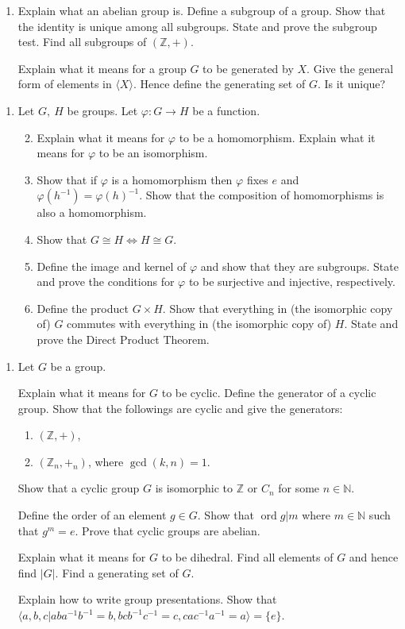 \documentclass[11pt]{article}
\newlength{\qspace}
\newcounter{qnumber}
\newenvironment{question}%
 {\vspace{\qspace}
  \begin{enumerate}[\bfseries 1\quad][10]%
    \setcounter{enumi}{\value{qnumber}}%
    \item%
 }
{
  \end{enumerate}
  \filbreak
  \stepcounter{qnumber}
 }
\newenvironment{questionparts}[1][1]%
 {
  \begin{enumerate}[\bfseries (i)]%
    \setcounter{enumii}{#1}
    \addtocounter{enumii}{-1}
    \setlength{\parskip}{3pt}
 }
 {
  \end{enumerate}
 }
\begin{document}
\begin{question}
Explain what an abelian group is. Define a subgroup of a group. Show that the identity is unique among all subgroups. State and prove the subgroup test.
Find all subgroups of $ (\mathbb{Z} ,+) $.

Explain what it means for a group $G$ to be generated by $X$. Give the general form of elements in $ \langle X \rangle  $. Hence define the generating set of $G$. Is it unique?
\end{question}

\begin{question}
  Let $ G,\ H $ be groups. Let $ \varphi: G\to H $ be a function.

  \begin{questionparts}
    \item Explain what it means for $ \varphi $ to be a homomorphism. Explain what it means for $ \varphi $ to be an isomorphism.
    \item Show that if $ \varphi $ is a homomorphism then $ \varphi $ fixes $e$ and $ \varphi (h^{-1})=\varphi (h)^{-1} $. Show that the composition of homomorphisms is also a homomorphism.
    \item Show that $ G \cong H \Leftrightarrow H \cong G $.
    \item Define the image and kernel of $ \varphi $ and show that they are subgroups. State and prove the conditions for $ \varphi $ to be surjective and injective, respectively.
    \item Define the product $ G \times H $. Show that everything in (the isomorphic copy of) $G$ commutes with everything in (the isomorphic copy of) $H$. State and prove the Direct Product Theorem.
  \end{questionparts}
\end{question}
\newpage
\begin{question}
  Let $G$ be a group. 
  
  Explain what it means for $G$ to be cyclic. Define the generator of a cyclic group. Show that the followings are cyclic and give the generators:
    \begin{enumerate}
      \item $ (\mathbb{Z} ,+) $,
      \item $ (\mathbb{Z}_n, +_n) $, where $ \gcd(k,n)=1 $.
    \end{enumerate}
  
  Show that a cyclic group $G$ is isomorphic to $ \mathbb{Z}  $ or $ C_n $ for some $ n\in \mathbb{N} $.

  Define the order of an element $ g\in G $. Show that $ \operatorname{ord} g |m$ where $ m\in \mathbb{N} $ such that $ g^m=e $. Prove that cyclic groups are abelian.

  Explain what it means for $G$ to be dihedral. Find all elements of $G$ and hence find $ |G| $. Find a generating set of $G$.

  Explain how to write group presentations. Show that $ \langle a,b,c| aba^{-1}b^{-1}=b, bcb^{-1}c^{-1}=c, cac^{-1}a^{-1}=a \rangle=\{e\} $.
\end{question}
\end{document}
